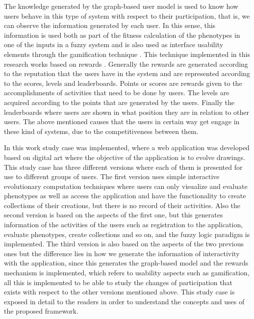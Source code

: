 \par The knowledge generated by the graph-based user model is used to know how users
behave in this type of system with respect to their participation, that is, we
can observe the information generated by each user. In this sense, this
information is used both as part of the fitness calculation of the phenotypes in
one of the inputs in a fuzzy system and is also used as interface usability
elements through the gamification technique \cite{huotari2012defining,
deterding2011game, hickman2010total, mcgonigal2011reality}. This technique
implemented in this research works based on rewards \cite{sutter2010browse}.
Generally the rewards are generated according to the reputation that the users
have in the system and are represented according to the scores, levels and
leaderboards. Points or scores are rewards given to the accomplishments of
activities that need to be done by users. The levels are acquired according to
the points that are generated by the users. Finally the leaderboards where users
are shown in what position they are in relation to other users. The above
mentioned causes that the users in certain way get engage in these kind of
systems, due to the competitiveness between them.

\par In this work study case  was implemented, where a web application was
developed based on digital art where the objective of the application is to
evolve drawings. This study case has three different versions where each of them
is presented for use to different groups of users. The first version uses simple
interactive evolutionary computation techniques where users can only visualize
and evaluate phenotypes as well as access the application and have the
functionality to create collections of their creations, but there is no record
of their activities. Also the second version is based on the aspects of the
first one, but this generates information of the activities of the users such as
registration to the application, evaluate phenotypes, create collections and so
on, and the fuzzy logic paradigm is implemented.  The third version is also
based on the aspects of the two previous ones but the difference lies in how we
generate the information of interactivity with the application, since this
generates the graph-based model and the rewards mechanism is implemented, which
refers to usability aspects such as gamification, all this is implemented to be
able to study the changes of participation that exists with respect to the other
versions mentioned above. This study case is exposed in detail to the readers in
order to understand the concepts and uses of the proposed framework.

